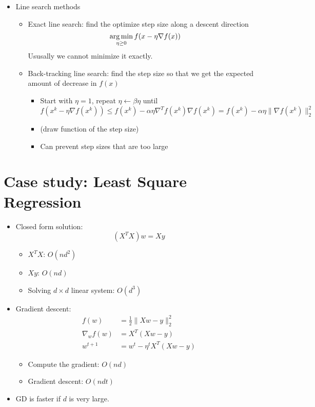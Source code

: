 \documentclass[11pt]{article}
\begin{document}
\begin{itemize}
    \item Line search methods
        \begin{itemize}
            \item Exact line search: find the optimize step size along a descent direction
                $$
                \operatorname*{arg\,min}_{\eta\ge 0} f(x - \eta\nabla f(x))
                $$
                Ususally we cannot minimize it exactly.
            \item Back-tracking line search: find the step size so that we get the expected amount of decrease in $f(x)$
                \begin{itemize}
                    \item Start with $\eta=1$, repeat $\eta\leftarrow \beta \eta$ until
                        $$
                        f(x^k - \eta\nabla f(x^k)) \le f(x^k) - \alpha \eta \nabla^T f(x^k) \nabla f(x^k)
                        = f(x^k)  - \alpha \eta \|\nabla f(x^k)\|_2^2
                        $$
                    \item (draw function of the step size)
                    \item Can prevent step sizes that are too large
                \end{itemize}
        \end{itemize}
\end{itemize}

\section{Case study: Least Square Regression}
\begin{itemize}
    \item Closed form solution:
        $$
        (X^TX)w = Xy
        $$
        \begin{itemize}
            \item $X^TX$: $O(nd^2)$
            \item $Xy$: $O(nd)$
            \item Solving $d\times d$ linear system: $O(d^3)$
        \end{itemize}
    \item Gradient descent:
        \begin{align}
            f(w) &= \frac{1}{2}\|Xw - y\|_2^2 \\
            \nabla_w f(w) &= X^T(Xw - y) \\
            w^{t+1} &= w^t - \eta^t  X^T(Xw - y)
        \end{align}
        \begin{itemize}
            \item Compute the gradient: $O(nd)$
            \item Gradient descent: $O(ndt)$
        \end{itemize}
    \item GD is faster if $d$ is very large.
\end{itemize}
\end{document}
